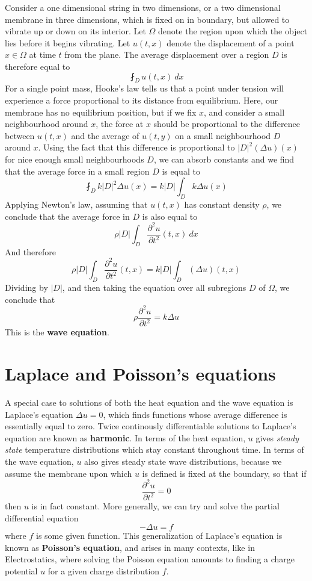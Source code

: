 Consider a one dimensional string in two dimensions, or a two dimensional membrane in three dimensions, which is fixed on in boundary, but allowed to vibrate up or down on its interior. Let $\Omega$ denote the region upon which the object lies before it begins vibrating. Let $u(t,x)$ denote the displacement of a point $x \in \Omega$ at time $t$ from the plane. The average displacement over a region $D$ is therefore equal to
%
\[ \fint_D u(t,x)\ dx \]
%
For a single point mass, Hooke's law tells us that a point under tension will experience a force proportional to its distance from equilibrium. Here, our membrane has no equilibrium position, but if we fix $x$, and consider a small neighbourhood around $x$, the force at $x$ should be proportional to the difference between $u(t,x)$ and the average of $u(t,y)$ on a small neighbourhood $D$ around $x$. Using the fact that this difference is proportional to $|D|^2 (\Delta u)(x)$ for nice enough small neighbourhoods $D$, we can absorb constants and we find that the average force in a small region $D$ is equal to
%
\[ \fint_D k |D|^2 \Delta u(x) = k |D| \int_D k \Delta u(x) \]
%
Applying Newton's law, assuming that $u(t,x)$ has constant density $\rho$, we conclude that the average force in $D$ is also equal to
%
\[ \rho |D| \int_D \frac{\partial^2 u}{\partial t^2}(t,x) \ dx \]
%
And therefore
%
\[ \rho |D| \int_D \frac{\partial^2 u}{\partial t^2}(t,x) = k |D| \int_D (\Delta u)(t,x) \]
%
Dividing by $|D|$, and then taking the equation over all subregions $D$ of $\Omega$, we conclude that
%
\[ \rho \frac{\partial^2 u}{\partial t^2} = k \Delta u \]
%
This is the {\bf wave equation}.

\section{Laplace and Poisson's equations}

A special case to solutions of both the heat equation and the wave equation is Laplace's equation $\Delta u = 0$, which finds functions whose average difference is essentially equal to zero. Twice continously differentiable solutions to Laplace's equation are known as {\bf harmonic}. In terms of the heat equation, $u$ gives {\it steady state} temperature distributions which stay constant throughout time. In terms of the wave equation, $u$ also gives steady state wave distributions, because we assume the membrane upon which $u$ is defined is fixed at the boundary, so that if
%
\[ \frac{\partial^2 u}{\partial t^2} = 0 \]
%
then $u$ is in fact constant. More generally, we can try and solve the partial differential equation
%
\[ - \Delta u = f \]
%
where $f$ is some given function. This generalization of Laplace's equation is known as {\bf Poisson's equation}, and arises in many contexts, like in Electrostatics, where solving the Poisson equation amounts to finding a charge potential $u$ for a given charge distribution $f$.

